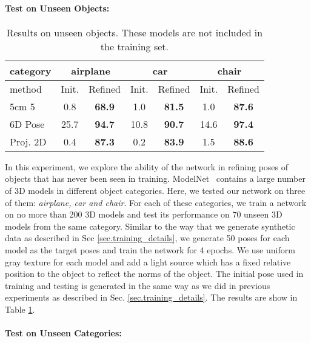 \documentclass[twocolumn]{svjour3}
\begin{document}
\paragraph{Test on Unseen Objects:}

\begin{table}
\centering
\caption{Results on unseen objects. These models are not included in the training set.}
\small
\begin{tabular}{l|c|c|c|c|c|c}
\hline
category & \multicolumn{2}{c|}{airplane}& \multicolumn{2}{c|}{car}& \multicolumn{2}{c}{chair}\\
\hline
method  & Init. & Refined & Init. & Refined &Init. & Refined\\
\hline
5cm 5\degree	& 0.8 & \textbf{68.9} & 1.0 	& \textbf{81.5} & 1.0 	& \textbf{87.6} \\
6D Pose  & 25.7  & \textbf{94.7} & 10.8	& \textbf{90.7} & 14.6 & \textbf{97.4} \\
Proj. 2D & 0.4 & \textbf{87.3} & 0.2 	& \textbf{83.9} & 1.5	& \textbf{88.6} \\
\hline
\end{tabular}
\label{table.unseen_objects}
\end{table}

In this experiment, we explore the ability of the network in refining poses of objects that has never been seen in training. 
ModelNet~\citep{wu20153d} contains a large number of 3D models in different object categories. 
Here, we tested our network on three of them: \textit{airplane, car and chair}. For each of these categories, we train a network on no more than 200 3D models and test its performance on 70 unseen 3D models from the same category. Similar to the way that we generate synthetic data as described in Sec \ref{sec.training_details}, we generate 50 poses for each model as the target poses and train the network for 4 epochs. We use uniform gray texture for each model and add a light source which has a fixed relative position to the object to reflect the norms of the object. 
The initial pose used in training and testing is generated in the same way as we did in previous experiments as described in Sec. \ref{sec.training_details}. The results are show in Table \ref{table.unseen_objects}.

\paragraph{Test on Unseen Categories:}
\end{document}
